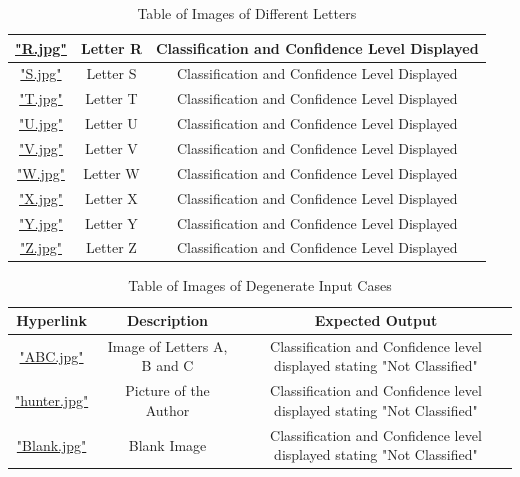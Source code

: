 \documentclass[12pt, titlepage]{article}
\begin{document}
\begin{table}[h!]
\begin{tabular}{|c|c|c|}
    \hyperref[R.jpg]{"R.jpg"} & Letter R & Classification and Confidence Level Displayed\\ \hline
    \hyperref[S.jpg]{"S.jpg"} & Letter S & Classification and Confidence Level Displayed\\ \hline
    \hyperref[T.jpg]{"T.jpg"} & Letter T & Classification and Confidence Level Displayed\\ \hline
    \hyperref[U.jpg]{"U.jpg"} & Letter U & Classification and Confidence Level Displayed\\ \hline
    \hyperref[V.jpg]{"V.jpg"} & Letter V & Classification and Confidence Level Displayed\\ \hline
    \hyperref[W.jpg]{"W.jpg"} & Letter W & Classification and Confidence Level Displayed\\ \hline
    \hyperref[X.jpg]{"X.jpg"} & Letter X & Classification and Confidence Level Displayed\\ \hline
    \hyperref[Y.jpg]{"Y.jpg"} & Letter Y & Classification and Confidence Level Displayed\\ \hline
    \hyperref[Z.jpg]{"Z.jpg"} & Letter Z & Classification and Confidence Level Displayed\\ \hline
  \end{tabular}
  \caption{Table of Images of Different Letters}
  \label{table_labels}
\end{table}

\begin{table}[h!]
  \centering
  \begin{tabular}{|c|c|c|}
    \hline
    \textbf{Hyperlink} & \textbf{Description} & \textbf{Expected Output} \\ \hline
    \hyperref[ABC]{"ABC.jpg"} & Image of Letters A, B and C& Classification and Confidence level displayed stating "Not Classified"\\ \hline
    \hyperref[Picture]{"hunter.jpg"} & Picture of the Author & Classification and Confidence level displayed stating "Not Classified" \\ \hline
    \hyperref[Blank]{"Blank.jpg"} & Blank Image & Classification and Confidence level displayed stating "Not Classified" \\ \hline
  \end{tabular}
  \caption{Table of Images of Degenerate Input Cases}
  \label{table_degen}
\end{table}
\end{document}
